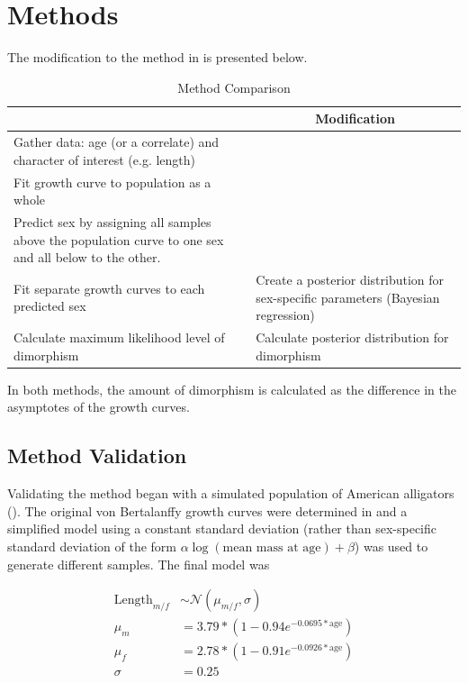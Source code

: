 \documentclass[letterpaper]{article}
\begin{document}
\section{Methods}
The modification to the method in \cite{saittaEffectSizeStatistical2020} is presented below.

\begin{table}[H]
    \centering
    \caption{Method Comparison}
    \begin{tabularx}{\textwidth}{XX}
        \toprule
        \multicolumn{1}{c}{\cite{saittaEffectSizeStatistical2020}} & \multicolumn{1}{c}{Modification} \\
        \midrule
        Gather data: age (or a correlate) and character of interest (e.g. length) & \\
        Fit growth curve to population as a whole & \\
        Predict sex by assigning all samples above the population curve to one sex and all below to the other. & \\
        Fit separate growth curves to each predicted sex & Create a posterior distribution for sex-specific parameters (Bayesian regression) \\
        Calculate maximum likelihood level of dimorphism & Calculate posterior distribution for dimorphism \\
        \bottomrule
    \end{tabularx}
\end{table}

In both methods, the amount of dimorphism is calculated as the difference in the asymptotes of the growth curves.

\subsection{Method Validation}

Validating the method began with a simulated population of American alligators (). The original von Bertalanffy growth curves were determined in \cite{wilkinsonGrowthRatesAmerican1997} and a simplified model using a constant standard deviation (rather than sex-specific standard deviation of the form $\alpha \log(\text{mean mass at age}) + \beta$) was used to generate different samples. The final model was

\begin{align*}
\text{Length}_{ m / f } &\sim \mathcal{N}\left(\mu_{ m / f }, \sigma\right) \\
\mu_m &= 3.79 * \left(1 - 0.94e^{-0.0695 \ast \text{age}}\right) \\
\mu_f &= 2.78 * \left(1 - 0.91e^{-0.0926 \ast \text{age}}\right) \\
\sigma &= 0.25
\end{align*}
\end{document}
